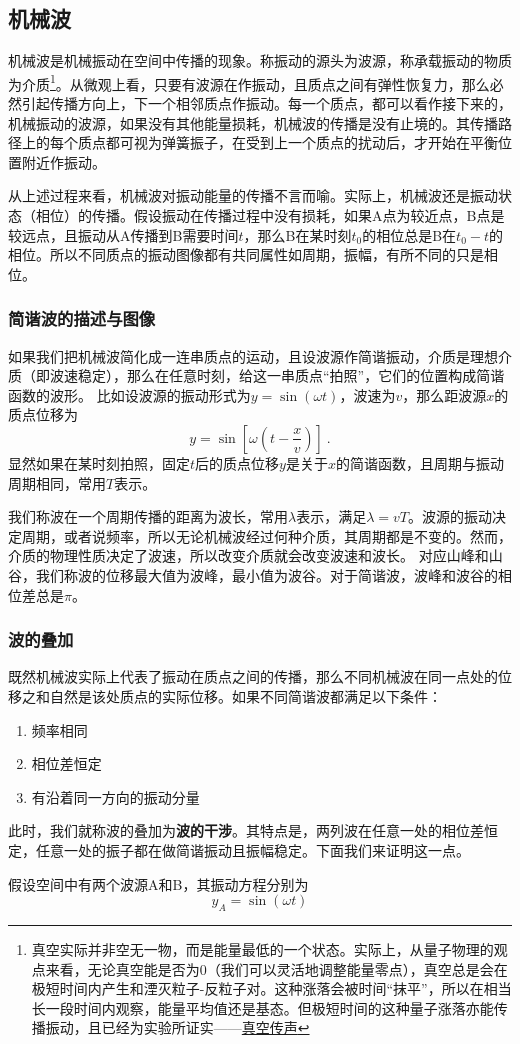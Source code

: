 
\subsection{机械波}
机械波是机械振动在空间中传播的现象。称振动的源头为波源，称承载振动的物质为介质\footnote{真空实际并非空无一物，而是能量最低的一个状态。实际上，从量子物理的观点来看，无论真空能是否为0（我们可以灵活地调整能量零点），真空总是会在极短时间内产生和湮灭粒子-反粒子对。这种涨落会被时间“抹平”，所以在相当长一段时间内观察，能量平均值还是基态。但极短时间的这种量子涨落亦能传播振动，且已经为实验所证实——\href{https://www.rmzxw.com.cn/c/2023-08-25/3399291.shtml}{真空传声}}。从微观上看，只要有波源在作振动，且质点之间有弹性恢复力，那么必然引起传播方向上，下一个相邻质点作振动。每一个质点，都可以看作接下来的，机械振动的波源，如果没有其他能量损耗，机械波的传播是没有止境的。其传播路径上的每个质点都可视为弹簧振子，在受到上一个质点的扰动后，才开始在平衡位置附近作振动。

从上述过程来看，机械波对振动能量的传播不言而喻。实际上，机械波还是振动状态（相位）的传播。假设振动在传播过程中没有损耗，如果A点为较近点，B点是较远点，且振动从A传播到B需要时间$t$，那么B在某时刻$t_0$的相位总是B在$t_0-t$的相位。所以不同质点的振动图像都有共同属性如周期，振幅，有所不同的只是相位。
\subsubsection{简谐波的描述与图像}
如果我们把机械波简化成一连串质点的运动，且设波源作简谐振动，介质是理想介质（即波速稳定），那么在任意时刻，给这一串质点“拍照”，它们的位置构成简谐函数的波形。
比如设波源的振动形式为$y=\sin(\omega t)$，波速为$v$，那么距波源$x$的质点位移为
\begin{equation}
y=\sin [\omega (t-\frac{x}{v})]~.
\end{equation}
显然如果在某时刻拍照，固定$t$后的质点位移$y$是关于$x$的简谐函数，且周期与振动周期相同，常用$T$表示。%

我们称波在一个周期传播的距离为波长，常用$\lambda $表示，满足$\lambda=vT$。波源的振动决定周期，或者说频率，所以无论机械波经过何种介质，其周期都是不变的。然而，介质的物理性质决定了波速，所以改变介质就会改变波速和波长。
对应山峰和山谷，我们称波的位移最大值为波峰，最小值为波谷。对于简谐波，波峰和波谷的相位差总是$\pi$。

\subsubsection{波的叠加}
既然机械波实际上代表了振动在质点之间的传播，那么不同机械波在同一点处的位移之和自然是该处质点的实际位移。如果不同简谐波都满足以下条件：
\begin{enumerate}
\item 频率相同
\item 相位差恒定
\item 有沿着同一方向的振动分量
\end{enumerate}
此时，我们就称波的叠加为\textbf{波的干涉}。其特点是，两列波在任意一处的相位差恒定，任意一处的振子都在做简谐振动且振幅稳定。下面我们来证明这一点。

假设空间中有两个波源A和B，其振动方程分别为
\begin{equation}
y_A=\sin(\omega t)
\end{equation}
